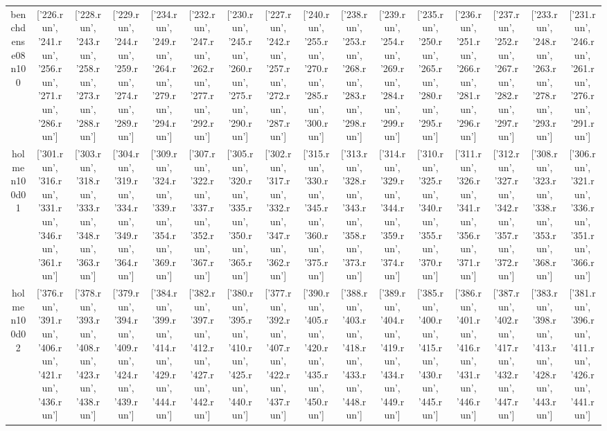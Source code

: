 \documentclass[landscape, 12pt]{report}
\begin{document}
\begin{tabular}{|c|c|c|c|c|c|c|c|c|c|c|c|c|c|c|c|}
\\
benchdense08n100 & ['226.run', '241.run', '256.run', '271.run', '286.run'] & ['228.run', '243.run', '258.run', '273.run', '288.run'] & ['229.run', '244.run', '259.run', '274.run', '289.run'] & ['234.run', '249.run', '264.run', '279.run', '294.run'] & ['232.run', '247.run', '262.run', '277.run', '292.run'] & ['230.run', '245.run', '260.run', '275.run', '290.run'] & ['227.run', '242.run', '257.run', '272.run', '287.run'] & ['240.run', '255.run', '270.run', '285.run', '300.run'] & ['238.run', '253.run', '268.run', '283.run', '298.run'] & ['239.run', '254.run', '269.run', '284.run', '299.run'] & ['235.run', '250.run', '265.run', '280.run', '295.run'] & ['236.run', '251.run', '266.run', '281.run', '296.run'] & ['237.run', '252.run', '267.run', '282.run', '297.run'] & ['233.run', '248.run', '263.run', '278.run', '293.run'] & ['231.run', '246.run', '261.run', '276.run', '291.run']
\\
holmen100d01 & ['301.run', '316.run', '331.run', '346.run', '361.run'] & ['303.run', '318.run', '333.run', '348.run', '363.run'] & ['304.run', '319.run', '334.run', '349.run', '364.run'] & ['309.run', '324.run', '339.run', '354.run', '369.run'] & ['307.run', '322.run', '337.run', '352.run', '367.run'] & ['305.run', '320.run', '335.run', '350.run', '365.run'] & ['302.run', '317.run', '332.run', '347.run', '362.run'] & ['315.run', '330.run', '345.run', '360.run', '375.run'] & ['313.run', '328.run', '343.run', '358.run', '373.run'] & ['314.run', '329.run', '344.run', '359.run', '374.run'] & ['310.run', '325.run', '340.run', '355.run', '370.run'] & ['311.run', '326.run', '341.run', '356.run', '371.run'] & ['312.run', '327.run', '342.run', '357.run', '372.run'] & ['308.run', '323.run', '338.run', '353.run', '368.run'] & ['306.run', '321.run', '336.run', '351.run', '366.run']
\\
holmen100d02 & ['376.run', '391.run', '406.run', '421.run', '436.run'] & ['378.run', '393.run', '408.run', '423.run', '438.run'] & ['379.run', '394.run', '409.run', '424.run', '439.run'] & ['384.run', '399.run', '414.run', '429.run', '444.run'] & ['382.run', '397.run', '412.run', '427.run', '442.run'] & ['380.run', '395.run', '410.run', '425.run', '440.run'] & ['377.run', '392.run', '407.run', '422.run', '437.run'] & ['390.run', '405.run', '420.run', '435.run', '450.run'] & ['388.run', '403.run', '418.run', '433.run', '448.run'] & ['389.run', '404.run', '419.run', '434.run', '449.run'] & ['385.run', '400.run', '415.run', '430.run', '445.run'] & ['386.run', '401.run', '416.run', '431.run', '446.run'] & ['387.run', '402.run', '417.run', '432.run', '447.run'] & ['383.run', '398.run', '413.run', '428.run', '443.run'] & ['381.run', '396.run', '411.run', '426.run', '441.run']

\end{tabular}
\end{document}
